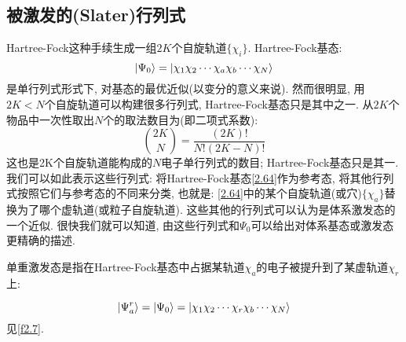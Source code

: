 \subsection{被激发的(Slater)行列式}
 \label{sec2.2.6}
Hartree-Fock这种手续生成一组$2K$个自旋轨道$\{\chi_i\}$. Hartree-Fock基态:
\begin{equation}
\label{2.64}
\Ket{\Psi_0}=\Ket{\chi_1\chi_2\cdots\chi_a\chi_b\cdots\chi_N}
\end{equation}
是单行列式形式下, 对基态的最优近似(以变分的意义来说). 然而很明显, 用$2K<N$个自旋轨道可以构建很多行列式, Hartree-Fock基态只是其中之一. 从$2K$个物品中一次性取出$N$个的取法数目为(即二项式系数):
\begin{equation*}
\binom{2K}{N}=\frac{(2K)!}{N!(2K-N)!}
\end{equation*}
这也是2K个自旋轨道能构成的$N$电子单行列式的数目; Hartree-Fock基态只是其一. 我们可以如此表示这些行列式: 将Hartree-Fock基态\ref{2.64}作为参考态, 将其他行列式按照它们与参考态的不同来分类, 也就是: \ref{2.64}中的某个自旋轨道(或穴)$\{\chi_a\}$替换为了哪个虚轨道(或粒子自旋轨道). 这些其他的行列式可以认为是体系激发态的一个近似. 很快我们就可以知道, 由这些行列式和$\Psi_0$可以给出对体系基态或激发态更精确的描述.

单重激发态是指在Hartree-Fock基态中占据某轨道$\chi_a$的电子被提升到了某虚轨道$\chi_r$上:

\begin{equation}
\Ket{\Psi_a^r}=\Ket{\Psi_0}=\Ket{\chi_1\chi_2\cdots\chi_r\chi_b\cdots\chi_N}
\end{equation}
见\ref{f2.7}.


